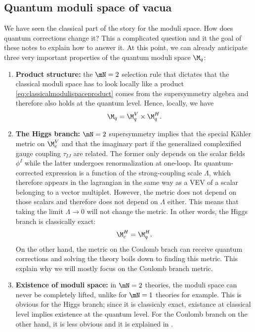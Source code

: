 \documentclass{worksheetclass}
\begin{document}
    \subsection{Quantum moduli space of vacua}

        We have seen the classical part of the story for the moduli space. How does quantum corrections change it? This a complicated question and it the goal of these notes to explain how to answer it. At this point, we can already anticipate three very important properties of the quantum moduli space $\M_q$:
        \begin{enumerate}
            \item \textbf{Product structure:} the $\mN=2$ selection rule that dictates that the classical moduli space has to look locally like a product \eqref{eq:classicalmodulispaceproduct} comes from the supersymmetry algebra and therefore also holds at the quantum level. Hence, locally, we have
            \begin{equation}
                \M_q = \M^V_{q}\times\M^H_{q}.\label{eq:quantummodulispaceproduct}
            \end{equation}
            \item \textbf{The Higgs branch:} $\mN=2$ supersymmetry implies that the special Kähler metric on $\M^V_{c}$ and that the imaginary part if the generalized complexified gauge coupling $\tau_{IJ}$ are related. The former only depends on the scalar fields $\phi^I$ while the latter undergoes renormalization at one-loop. Its quantum-corrected expression is a function of the strong-coupling scale $\Lambda$, which therefore appears in the lagrangian in the same way as a VEV of a scalar belonging to a vector multiplet. However, the metric does not depend on those scalars and therefore does not depend on $\Lambda$ either. This means that taking the limit $\Lambda\to0$ will not change the metric. In other words, the Higgs branch is classically exact:
            \begin{equation}
                \M^H_{c}=\M^H_{q}.
            \end{equation}
            On the other hand, the metric on the Coulomb brach can receive quantum corrections and solving the theory boils down to finding this metric. This explain why we will mostly focus on the Coulomb branch metric.
            \item \textbf{Existence of moduli space:} in $\mN=2$ theories, the moduli space can never be completely lifted, unlike for $\mN=1$ theories for example. This is obvious for the Higgs branch; since it is classicaly exact, existance at classical level implies existence at the quantum level. For the Coulomb branch on the other hand, it is less obvious and it is explained in \cite[p. 282]{bertolinisusy}.
        \end{enumerate}
\end{document}
